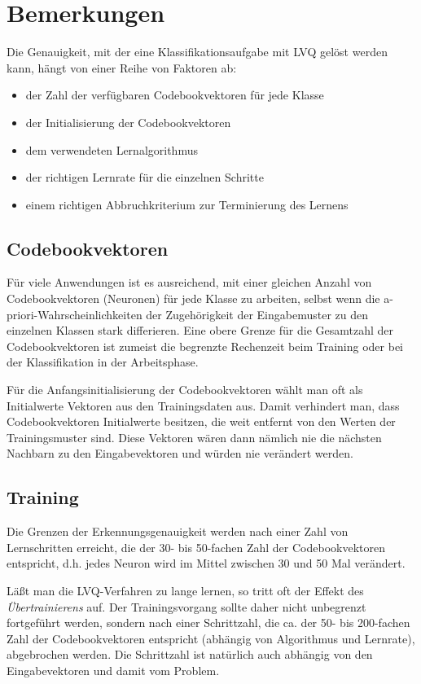 \section*{Bemerkungen}
Die Genauigkeit, mit der eine Klassifikationsaufgabe mit LVQ gelöst werden kann, hängt von einer Reihe von Faktoren ab:

\begin{itemize}
	\item der Zahl der verfügbaren Codebookvektoren für jede Klasse
	\item der Initialisierung der Codebookvektoren
	\item dem verwendeten Lernalgorithmus
	\item der richtigen Lernrate für die einzelnen Schritte
	\item einem richtigen Abbruchkriterium zur Terminierung des Lernens
\end{itemize}

\subsection*{Codebookvektoren}
Für viele Anwendungen ist es ausreichend, mit einer gleichen Anzahl von Codebookvektoren (Neuronen) für jede Klasse zu arbeiten, selbst wenn die a-priori-Wahrscheinlichkeiten der Zugehörigkeit der Eingabemuster zu den einzelnen Klassen stark differieren.
Eine obere Grenze für die Gesamtzahl der Codebookvektoren ist zumeist die begrenzte Rechenzeit beim Training oder bei der Klassifikation in der Arbeitsphase.

Für die Anfangsinitialisierung der Codebookvektoren wählt man oft als
Initialwerte Vektoren aus den Trainingsdaten aus. Damit verhindert man, dass Codebookvektoren Initialwerte besitzen, die weit entfernt von den Werten der Trainingsmuster sind. Diese Vektoren wären dann nämlich nie die nächsten Nachbarn zu den Eingabevektoren und würden nie verändert werden.

\subsection*{Training}
Die Grenzen der Erkennungsgenauigkeit werden nach einer Zahl von Lernschritten erreicht, die der 30- bis 50-fachen Zahl der Codebookvektoren entspricht, d.h. jedes Neuron wird im Mittel zwischen 30 und 50 Mal verändert.

Läßt man die LVQ-Verfahren zu lange lernen, so tritt oft der Effekt des \emph{Übertrainierens} auf.
Der Trainingsvorgang sollte daher nicht unbegrenzt fortgeführt werden, sondern nach einer Schrittzahl, die ca. der 50- bis 200-fachen Zahl der Codebookvektoren entspricht (abhängig von Algorithmus und Lernrate), abgebrochen werden. Die Schrittzahl ist natürlich auch abhängig von den Eingabevektoren und damit vom Problem.

